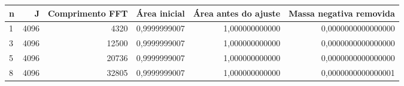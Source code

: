 \begin{tabular}{lrrrrr}
\toprule
n & J & Comprimento FFT & Área inicial & Área antes do ajuste & Massa negativa removida \\
\midrule
1 & 4096 & 4320 & 0,9999999007 & 1,000000000000 & 0,0000000000000000 \\
3 & 4096 & 12500 & 0,9999999007 & 1,000000000000 & 0,0000000000000000 \\
5 & 4096 & 20736 & 0,9999999007 & 1,000000000000 & 0,0000000000000000 \\
8 & 4096 & 32805 & 0,9999999007 & 1,000000000000 & 0,0000000000000001 \\
\bottomrule
\end{tabular}
